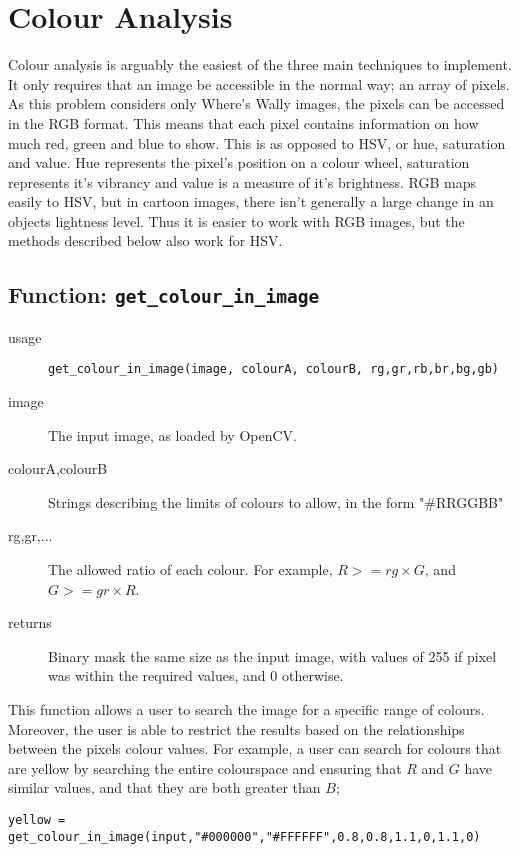 \documentclass[../main.tex]{subfiles}
\begin{document}
  \section{Colour Analysis}
    Colour analysis is arguably the easiest of the three main techniques to implement.
    It only requires that an image be accessible in the normal way; an array of pixels.
    As this problem considers only Where's Wally images, the pixels can be accessed in the RGB format.
    This means that each pixel contains information on how much red, green and blue to show.
    This is as opposed to HSV, or hue, saturation and value.
    Hue represents the pixel's position on a colour wheel, saturation represents it's vibrancy and value is a measure of it's brightness.
    RGB maps easily to HSV, but in cartoon images, there isn't generally a large change in an objects lightness level.
    Thus it is easier to work with RGB images, but the methods described below also work for HSV.

  \subsection{Function: \texttt{get\_colour\_in\_image}}
    \begin{description}
      \item[usage] \texttt{get\_colour\_in\_image(image, colourA, colourB, rg,gr,rb,br,bg,gb)}
      \item[image] The input image, as loaded by OpenCV.
      \item[colourA,colourB] Strings describing the limits of colours to allow, in the form "\#RRGGBB"
      \item[rg,gr,...] The allowed ratio of each colour. For example, $R >= rg\times G$, and $G >=gr\times R$.
      \item[returns] Binary mask the same size as the input image, with values of 255 if pixel was within the required values, and 0 otherwise.
    \end{description}

    This function allows a user to search the image for a specific range of colours.
    Moreover, the user is able to restrict the results based on the relationships between the pixels colour values.
    For example, a user can search for colours that are yellow by searching the entire colourspace and ensuring that $R$ and $G$ have similar values, and that they are both greater than $B$;
    \begin{center}
      \texttt{yellow = get\_colour\_in\_image(input,"\#000000","\#FFFFFF",0.8,0.8,1.1,0,1.1,0)}
    \end{center}
\end{document}
